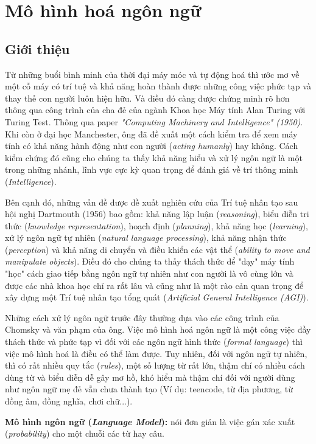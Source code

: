 \section{Mô hình hoá ngôn ngữ}
\subsection{Giới thiệu}
 Từ những buổi bình minh của thời đại máy móc và tự động hoá thì ước mơ về một cỗ máy có trí tuệ và khả năng hoàn thành được những công việc phức tạp và thay thế con người luôn hiện hữu. Và điều đó càng được chứng minh rõ hơn thông qua công trình của cha đẻ của ngành Khoa học Máy tính Alan Turing với Turing Test.  Thông qua paper \textit{"Computing Machinery and Intelligence" (1950)}. Khi còn ở đại học Manchester, ông đã đề xuất một cách kiểm tra để xem máy tính có khả năng hành động như con người (\textit{acting humanly}) hay không. 
Cách kiểm chứng đó cũng cho chúng ta thấy khả năng hiểu và xử lý ngôn ngữ là một trong những nhánh, lĩnh vực cực kỳ quan trọng để đánh giá về trí thông minh (\textit{Intelligence}).

Bên cạnh đó, những vấn đề được đề xuất nghiên cứu của Trí tuệ nhân tạo sau hội nghị Dartmouth (1956) bao gồm: khả năng lập luận (\textit{reasoning}), biểu diễn tri thức (\textit{knowledge representation}), hoạch định (\textit{planning}), khả năng học (\textit{learning}), xử lý ngôn ngữ tự nhiên (\textit{natural language processing}), khả năng nhận thức (\textit{perception}) và khả năng di chuyển và điều khiển các vật thể (\textit{ability to move and manipulate objects}). 
Điều đó cho chúng ta thấy thách thức để "dạy" máy tính "học" cách giao tiếp bằng ngôn ngữ tự nhiên như con người là vô cùng lớn và được các nhà khoa học chỉ ra rất lâu và cũng như là một rào cản quan trọng để xây dựng một Trí tuệ nhân tạo tổng quát (\textit{Artificial General Intelligence (AGI)}).

Những cách xử lý ngôn ngữ trước đây thường dựa vào các công trình của Chomsky và văn phạm của ông. Việc mô hình hoá ngôn ngữ là một công việc đầy thách thức và phức tạp vì đối với các ngôn ngữ hình thức (\textit{formal language}) thì việc mô hình hoá là điều có thể làm được. Tuy nhiên, đối với ngôn ngữ tự nhiên, thì có rất nhiều quy tắc (\textit{rules}), một số lượng từ rất lớn, thậm chí có nhiều cách dùng từ và 
biểu diễn dễ gây mơ hồ, khó hiểu mà thậm chí đối với người dùng như ngôn ngữ mẹ đẻ vẫn chưa thành tạo (Ví dụ: teencode, từ địa phương, từ đồng âm, đồng nghĩa, chơi chữ...).

\textbf{Mô hình ngôn ngữ (\textit{Language Model}):} nói đơn giản là việc gán xác xuất (\textit{probability}) cho một chuỗi các từ hay câu. 

